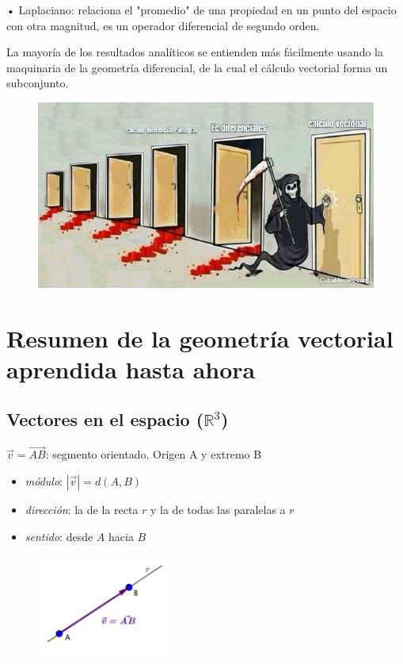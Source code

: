 \textcolor{gris}{ •	Laplaciano: relaciona el "promedio" de una propiedad en un punto del espacio con otra magnitud, es un operador diferencial de segundo orden.}

\textcolor{gris}{ La mayoría de los resultados analíticos se entienden más fácilmente usando la maquinaria de la geometría diferencial, de la cual el cálculo vectorial forma un subconjunto.}

\rightline{\textcolor{gris}{Fuente: Wikipedia}}

\begin{figure}[H]
	\centering
	\includegraphics[width=1\textwidth]{imagenes/imagenes10/xisteCalcVect.png}
\end{figure}

\section{Resumen de la geometría vectorial aprendida hasta ahora}


\subsection{Vectores en el espacio ($\mathbb R^3$)}

$\vec v= \overrightarrow { AB }  $: segmento orientado. Origen A y extremo B
	\begin{multicols}{2}		
	\begin{itemize}
	\item \textit{módulo}: $|\vec v|=d(A,B)$
	\item \textit{dirección}: la de la recta $r$ y la de todas las paralelas a $r$
	\item \textit{sentido}: desde $A$ hacia $B$
	\end{itemize}
	\begin{figure}[H]
		\centering
		\includegraphics[width=0.4\textwidth]{imagenes/imagenes10/T10IM01.png}
	\end{figure}
	\end{multicols}


